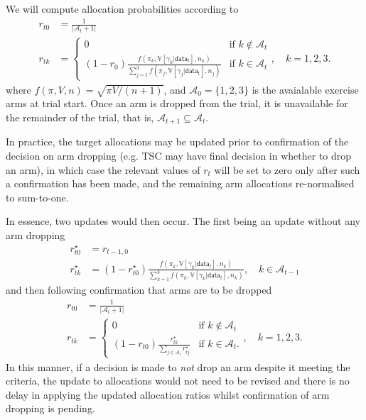 \documentclass[11pt,parskip=half-]{scrartcl}
\begin{document}
We will compute allocation probabilities according to
$$
  \begin{aligned}
    r_{t0} & = \frac{1}{|\mathcal{A}_t + 1|}              \\
    r_{tk} & = \begin{cases}
      0                                                                                                                                    & \text{if } k \notin \mathcal{A}_t \\
      (1 - r_0) \frac{f(\pi_k, \mathbb V[\gamma_k|\mathsf{data}_t], n_k)}{\sum_{j=1}^3 f(\pi_j, \mathbb V[\gamma_j|\mathsf{data}_t], n_j)} & \text{if }k\in\mathcal{A}_t
    \end{cases}, \quad k=1,2,3.
  \end{aligned}
$$
where $f(\pi, V, n) = \sqrt{\pi V/(n + 1)}$, and $\mathcal{A}_0 = \{1,2,3\}$ is the avaialable exercise arms at trial start. Once an arm is dropped from the trial, it is unavailable for the remainder of the trial, that is, $\mathcal{A}_{t+1} \subseteq \mathcal{A}_t$.

In practice, the target allocations may be updated prior to confirmation of the decision on arm dropping (e.g. TSC may have final decision in whether to drop an arm), in which case the relevant values of $r_t$ will be set to zero only after such a confirmation has been made, and the remaining arm allocations re-normalised to sum-to-one.

In essence, two updates would then occur. The first being an update without any arm dropping
$$
  \begin{aligned}
    r_{t0}^\star & = r_{t-1,0}                                                                                                                                                                 \\
    r_{tk}^\star & = (1 - r_{t0}^\star)\frac{f(\pi_k, \mathbb V[\gamma_k|\mathsf{data}_t], n_k)}{\sum_{k=1}^3 f(\pi_k, \mathbb V[\gamma_k|\mathsf{data}_t], n_k)}, \quad k\in\mathcal{A}_{t-1}
  \end{aligned}
$$
and then following confirmation that arms are to be dropped
$$
  \begin{aligned}
    r_{t0} & = \frac{1}{|\mathcal{A}_t + 1|}              \\
    r_{tk} & = \begin{cases}
      0                                                                       & \text{if } k \notin \mathcal{A}_t \\
      (1 - r_{t0}) \frac{r_{tk}^\star}{\sum_{j\in\mathcal{A}_t} r_{tj}^\star} & \text{if } k \in \mathcal{A}_t.
    \end{cases}, \quad k=1,2,3.
  \end{aligned}
$$
In this manner, if a decision is made to \emph{not} drop an arm despite it meeting the criteria, the update to allocations would not need to be revised and there is no delay in applying the updated allocation ratios whilst confirmation of arm dropping is pending.
\end{document}
